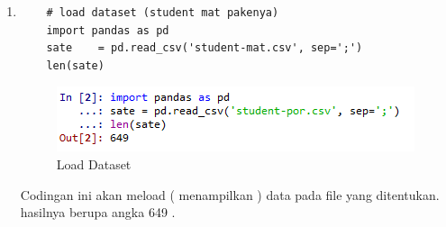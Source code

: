 \begin{enumerate}
\item
\begin{verbatim}
	# load dataset (student mat pakenya)
	import pandas as pd
	sate    = pd.read_csv('student-mat.csv', sep=';')
	len(sate)
\end{verbatim}
\begin{figure}[ht]
\centering
\includegraphics[scale=0.5]{figures/41.png}
\caption{Load Dataset}
\end{figure}
\par
	Codingan ini akan meload ( menampilkan ) data pada file yang ditentukan. hasilnya berupa angka 649 . 


\end{enumerate}
